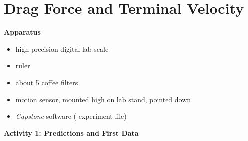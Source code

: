 \section{Drag Force and Terminal Velocity}

\begin{comment}
By Matt Trawick, 11/2019 (though surely many people have done similar things before this!)

\end{comment}

\makelabheader %

\medskip
\textbf{Apparatus}

\begin{itemize}[nosep]
\item high precision digital lab scale
\item ruler
\item about 5 coffee filters
\item motion sensor, mounted high on lab stand, pointed down
\item \textit{Capstone} software ( experiment file)
\end{itemize}

\medskip
\textbf{Activity 1: Predictions and First Data}

